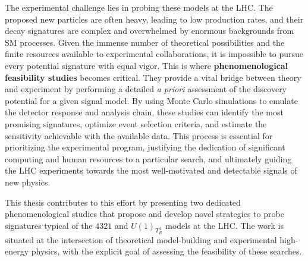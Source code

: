 The experimental challenge lies in probing these models at the LHC. The proposed new particles are often heavy, leading to low production rates, and their decay signatures are complex and overwhelmed by enormous  backgrounds from SM processes. Given the immense number of theoretical possibilities and the finite resources available to experimental collaborations, it is impossible to pursue every potential signature with equal vigor. This is where \textbf{phenomenological feasibility studies} becomes critical. They provide a vital bridge between theory and experiment by performing a detailed \textit{a priori} assessment of the discovery potential for a given signal model. By using Monte Carlo simulations to emulate the detector response and analysis chain, these studies can identify the most promising signatures, optimize event selection criteria, and estimate the sensitivity achievable with the available data. This process is essential for prioritizing the experimental program, justifying the dedication of significant computing and human resources to a particular search, and ultimately guiding the LHC experiments towards the most well-motivated and detectable signals of new physics.

This thesis contributes to this effort by presenting two dedicated phenomenological studies that propose and develop novel strategies to probe signatures typical of the $4321$ and $U(1)_{T^3_R}$ models at the LHC. The work is situated at the intersection of theoretical model-building and experimental high-energy physics, with the explicit goal of assessing the feasibility of these searches.


